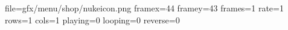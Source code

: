 file=gfx/menu/shop/nukeicon.png
framex=44
framey=43
frames=1
rate=1
rows=1
cols=1
playing=0
looping=0
reverse=0
